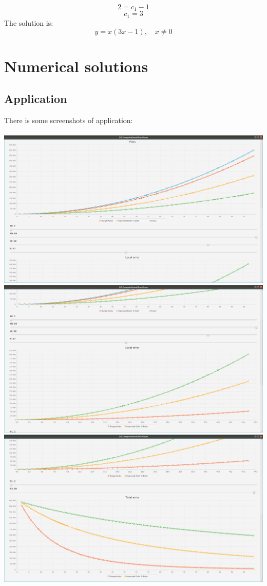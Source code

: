 \documentclass{article}
\begin{document}
  $$2 = c_1 - 1$$
  $$c_1 = 3$$
  The solution is:
  $$y = x(3x - 1), \quad x \neq 0$$

  \section{Numerical solutions}

  \subsection{Application}
  There is some screenshots of application:\\ \\
  \includegraphics[scale=0.2]{Plots.png} \\
  \includegraphics[scale=0.2]{LocalErrors.png} \\
  \includegraphics[scale=0.2]{TotalErrors.png}
\end{document}
